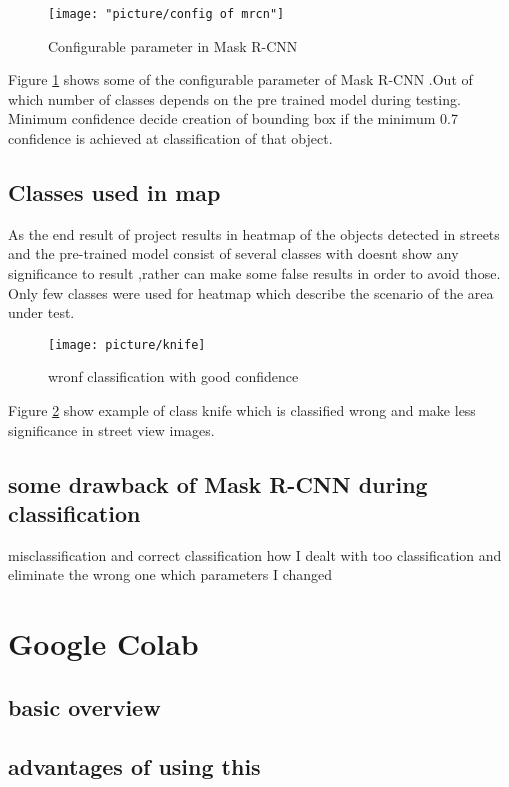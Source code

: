 \begin{figure}
	\centering
	\texttt{[image: "picture/config of mrcn"]}
	\caption{Configurable parameter in Mask R-CNN}
	\label{fig:config-of-mrcn}
\end{figure}

Figure \ref{fig:config-of-mrcn} shows some of the configurable parameter of Mask R-CNN .Out of which number of classes depends on the pre trained model during testing. Minimum confidence decide creation of bounding box if the minimum 0.7 confidence is achieved at classification of that object. 

\subsection{Classes used in map}
As the end result of project results in heatmap of the objects detected in streets and the pre-trained model consist of several classes with doesnt show any significance to result ,rather can make some false results in order to avoid those. Only few classes were used for heatmap which describe the scenario of the area under test.

\begin{figure}
	\centering
	\texttt{[image: picture/knife]}
	\caption{wronf classification with good confidence}
	\label{fig:knife}
\end{figure}
Figure \ref{fig:knife} show example of class knife which is classified wrong and make less significance in street view images.

\subsection{some drawback of Mask R-CNN during classification}
misclassification and correct classification 
how I dealt with too classification and eliminate the wrong one which parameters I changed


\section{Google Colab}

\subsection{basic overview}

\subsection{advantages of using this}

